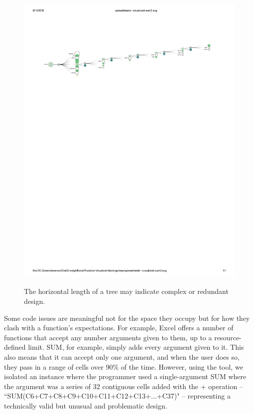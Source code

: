 \documentclass[conference]{IEEEtran}
\begin{document}
	\begin{figure}[h] \centering \includegraphics[width=\textwidth]{longsum}
		\label{"fig:longsum"} \caption{The horizontal length of a tree may indicate
			complex or redundant design.} \end{figure}
	
	Some code issues are meaningful not for the space they occupy but for how they
	clash with a function's expectations. For example, Excel offers a
	number of functions that accept any number arguments given to them, up to a
	resource-defined limit. SUM, for example, simply adds every argument given to it.
	This also means that it can accept only one argument, and when the user does so,
	they pass in a range of cells over 90\% of the time. However, using the tool,
	we isolated an instance where the programmer used a single-argument SUM where the 
	argument was a series of 32 contiguous cells added with the + operation -- 
	``SUM(C6+C7+C8+C9+C10+C11+C12+C13+...+C37)" -- representing a technically
	valid but unusual and problematic design.\par
	
\end{document}
